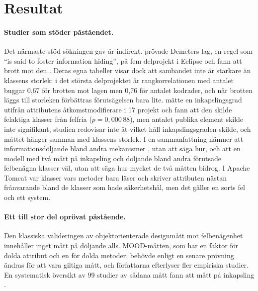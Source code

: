\section{Resultat}
\label{sec:inkf-resultat}

\paragraph{Studier som stöder påståendet.}  Det närmaste stöd sökningen
gav är indirekt.  \Textcite{Guo2011Demeter} prövade Demeters lag, en
regel som \enquote{is said to foster information hiding}, på fem
delprojekt i Eclipse och fann att brott mot den
.  Deras egna tabeller visar dock att sambandet inte är starkare
än klassens storlek: i det största delprojektet är rangkorrelationen med
antalet buggar 0,67 för brotten mot lagen men 0,76 för antalet kodrader,
och när brotten läggs till storleken förbättras förutsägelsen bara
lite\autocite[242--243]{Guo2011Demeter}.
\Textcite{Mekahlia2026Encapsulation} mätte en inkapslingsgrad utifrån
attributens åtkomstmodifierare i 17 projekt och fann att den skilde
felaktiga klasser från felfria ($p = 0{,}000\,88$), men antalet publika
element skilde inte signifikant, studien redovisar inte åt vilket håll
inkapslingsgraden skilde, och måttet hänger samman med klassens
storlek\autocite[27, 31]{Mekahlia2026Encapsulation}.
I en sammanfattning nämner \textcite{BritoeAbreu1996Impact} att
informationsdöljande bland andra mekanismer
, utan att säga hur, och
\textcite{Singh2011Encapsulation} att en modell med två mått på
inkapsling och döljande bland andra förutsade felbenägna klasser väl,
utan att säga hur mycket de två måtten bidrog.  I Apache Tomcat var
klasser vars metoder bara läser och skriver attributen nästan
frånvarande bland de klasser som hade
säkerhetshål\autocite[35]{Sultana2019MicroPatterns}, men det gäller en
sorts fel och ett system.

\paragraph{Ett till stor del oprövat påstående.}  Den klassiska
valideringen av objektorienterade designmått mot
felbenägenhet\autocite{Basili1996Validation} innehåller inget mått på
döljande alls.  MOOD-måtten, som har en faktor för dolda attribut och en
för dolda metoder, behövde enligt en senare prövning ändras för att vara
giltiga mått, och författarna efterlyser fler empiriska
studier\autocite{Harrison1998MOOD}.  En systematisk översikt av 99
studier av sådana mått fann att mått på inkapsling
.

